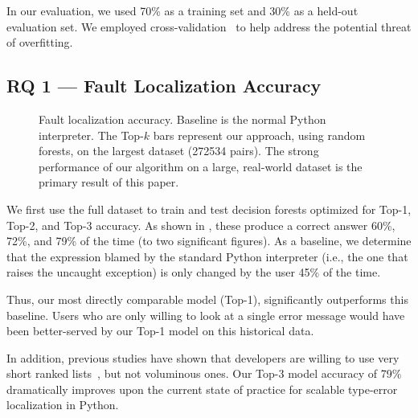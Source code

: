 \documentclass[conference]{IEEEtran}
\begin{document}
In our evaluation, we used 70\% as a training set and 30\% as a held-out
evaluation set. We employed cross-validation~\cite{kohavi} to help address
the potential threat of overfitting.

\subsection{RQ 1 --- Fault Localization Accuracy}

\begin{figure}
\caption{Fault localization accuracy.
Baseline is the normal Python interpreter. The Top-$k$ bars represent
our approach, using random forests,
on the largest dataset (272534 pairs). The strong performance of our
algorithm on a large, real-world dataset is the primary result of this paper.
}
\label{fig-full-dataset-acc-random-forest}
\end{figure}

We first use the full dataset to train and test decision forests optimized for
Top-1, Top-2, and Top-3 accuracy. As shown in ,
these produce a correct answer 60\%, 72\%, and
79\% of the time (to two significant figures). As a baseline, we determine that
the expression blamed by the standard Python interpreter (i.e., the one that
raises the uncaught exception) is only changed by the user 45\% of the
time.

Thus, our most directly comparable model (Top-1), significantly outperforms
this baseline. Users who are only willing to look at a single error message
would have been better-served by our Top-1 model on this historical data.

In addition, previous studies have shown that developers are willing to use
very short ranked lists~\cite[Sec.~5.6]{orso-parnin}, but not voluminous
ones. Our Top-3 model accuracy of 79\% dramatically improves upon the
current state of practice for scalable type-error localization in Python.

\end{document}
